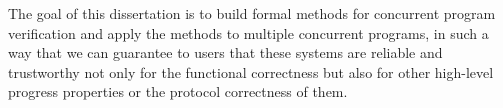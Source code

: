 
The goal of this dissertation is to build formal methods for concurrent program verification and apply the methods to multiple concurrent programs,
in such a way that we can guarantee to users that these systems are reliable and trustworthy not only for the functional correctness but also for 
other high-level progress properties or the protocol correctness of them. 

 

%
%
%
%
